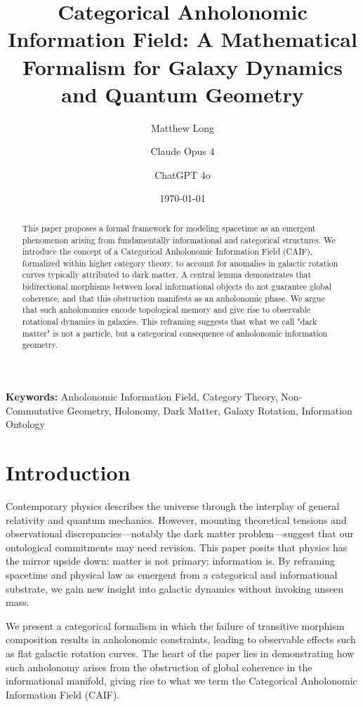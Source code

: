 \documentclass[11pt]{article}
\title{Categorical Anholonomic Information Field: A Mathematical Formalism for Galaxy Dynamics and Quantum Geometry}
\author[1]{Matthew Long}
\author[2]{Claude Opus 4}
\author[3]{ChatGPT 4o}
\affil[1]{Yoneda AI}}
\affil[2]{Anthropic}
\affil[3]{OpenAI}
\date{\today}
\theoremstyle{definition}
\theoremstyle{remark}
\begin{document}
\maketitle

\begin{abstract}
This paper proposes a formal framework for modeling spacetime as an emergent phenomenon arising from fundamentally informational and categorical structures. We introduce the concept of a Categorical Anholonomic Information Field (CAIF), formalized within higher category theory, to account for anomalies in galactic rotation curves typically attributed to dark matter. A central lemma demonstrates that bidirectional morphisms between local informational objects do not guarantee global coherence, and that this obstruction manifests as an anholonomic phase. We argue that such anholonomies encode topological memory and give rise to observable rotational dynamics in galaxies. This reframing suggests that what we call "dark matter" is not a particle, but a categorical consequence of anholonomic information geometry.
\end{abstract}

\vspace{1em}
\noindent \textbf{Keywords:} Anholonomic Information Field, Category Theory, Non-Commutative Geometry, Holonomy, Dark Matter, Galaxy Rotation, Information Ontology

\tableofcontents

\section{Introduction}

Contemporary physics describes the universe through the interplay of general relativity and quantum mechanics. However, mounting theoretical tensions and observational discrepancies---notably the dark matter problem---suggest that our ontological commitments may need revision. This paper posits that physics has the mirror upside down: matter is not primary; information is. By reframing spacetime and physical law as emergent from a categorical and informational substrate, we gain new insight into galactic dynamics without invoking unseen mass.

We present a categorical formalism in which the failure of transitive morphism composition results in anholonomic constraints, leading to observable effects such as flat galactic rotation curves. The heart of the paper lies in demonstrating how such anholonomy arises from the obstruction of global coherence in the informational manifold, giving rise to what we term the Categorical Anholonomic Information Field (CAIF).
\end{document}
